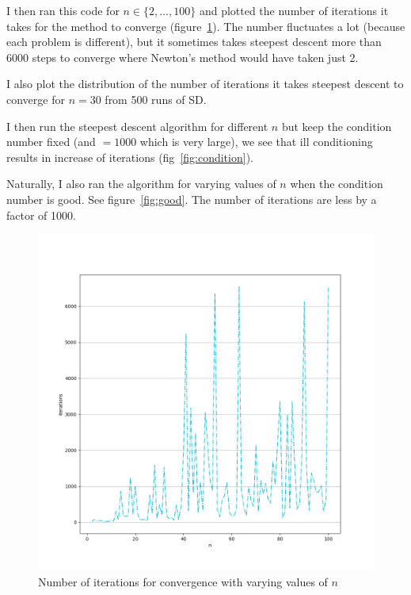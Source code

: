 \documentclass[11pt]{article}
\begin{document}
I then ran this code for $n\in\{2,\dotsc,100\}$ and plotted the number of iterations
it takes for the method to converge (figure~\ref{fig:niter}). The number fluctuates
a lot (because each problem is different), but it sometimes takes steepest descent
more than 6000 steps to converge where Newton's method would have taken just 2.\par
I also plot the distribution of the number of iterations it takes steepest descent
to converge for $n=30$ from 500 runs of SD.\par
I then run the steepest descent algorithm for different $n$ but keep the condition
number fixed (and $=1000$ which is very large), we see that ill conditioning results
in increase of iterations (fig~\ref{fig:condition}).\par
Naturally, I also ran the algorithm for varying values of $n$ when the condition
number is good. See figure~\ref{fig:good}. The number of iterations are less by
a factor of 1000.\par
\begin{figure}[!htbp]
    \includegraphics[width=\textwidth]{./niter.png}
    \caption{Number of iterations for convergence with varying values of $n$\label{fig:niter}}
\end{figure}
\end{document}
